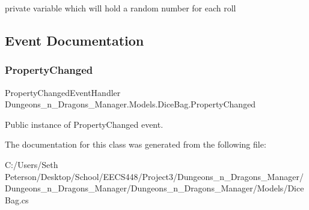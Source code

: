 private variable which will hold a random number for each roll 



\subsection{Event Documentation}
\mbox{\label{class_dungeons__n___dragons___manager_1_1_models_1_1_dice_bag_a3af8426fceed5fb4a66909af5d7242af}} 
\subsubsection{\texorpdfstring{Property\+Changed}{PropertyChanged}}
{\footnotesize\ttfamily Property\+Changed\+Event\+Handler Dungeons\+\_\+n\+\_\+\+Dragons\+\_\+\+Manager.\+Models.\+Dice\+Bag.\+Property\+Changed}



Public instance of Property\+Changed event. 



The documentation for this class was generated from the following file\+:\begin{DoxyCompactItemize}
\item 
C\+:/\+Users/\+Seth Peterson/\+Desktop/\+School/\+E\+E\+C\+S448/\+Project3/\+Dungeons\+\_\+n\+\_\+\+Dragons\+\_\+\+Manager/\+Dungeons\+\_\+n\+\_\+\+Dragons\+\_\+\+Manager/\+Dungeons\+\_\+n\+\_\+\+Dragons\+\_\+\+Manager/\+Models/Dice\+Bag.\+cs\end{DoxyCompactItemize}
